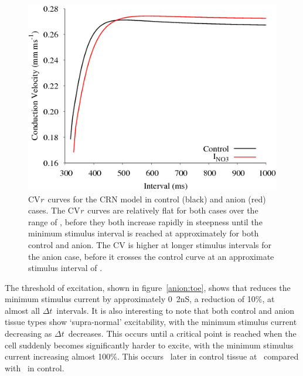 \begin{figure}
\includegraphics{figures/toolkit/anion/06_CV}
\caption[Anion Sensitive Conduction Velocity Restitution]{
\label{anion:cvr} CV\emph{r}\ curves for the CRN model in control (black) and anion
(red) cases. The CV\emph{r}\ curves are relatively flat for both cases over the range of
, before they both increase rapidly in steepness until the minimum
stimulus interval is reached at approximately  for both control and anion.
The CV is higher at longer stimulus intervals for the anion case, before it
crosses the control curve at an approximate stimulus interval of .}
\end{figure}

The threshold of excitation, shown in figure~\ref{anion:toe}, shows that
 reduces the minimum stimulus current by approximately \unit{0.2}{nS},
a reduction of 10\%, at almost all $\Delta t$\ intervals.  It is also
interesting to note that both control and anion tissue types show `supra-normal'
excitability, with the minimum stimulus current decreasing as $\Delta t$\
decreases.  This occurs until a critical point is reached when the cell suddenly
becomes significantly harder to excite, with the minimum stimulus current
increasing almost 100\%.  This occurs \ms{9}\ later in control tissue at
\ms{321}\, compared with \ms{330}\ in control.


